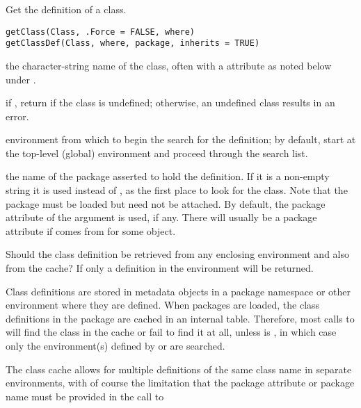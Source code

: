 %
\begin{Description}\relax
Get the definition of a class.
\end{Description}
%
\begin{Usage}
\begin{verbatim}
getClass(Class, .Force = FALSE, where)
getClassDef(Class, where, package, inherits = TRUE)
\end{verbatim}
\end{Usage}
%
\begin{Arguments}
\begin{ldescription}
\item[\code{Class}]  the character-string name of the class, often with a
 attribute as noted below under .
\item[\code{.Force}]  if , return  if the class is
undefined; otherwise, an undefined class results in an error.
\item[\code{where}]  environment from which to begin the search for the definition; by default,
start at the top-level (global) environment and proceed through
the search list.
\item[\code{package}]  the name of the package asserted to hold the
definition.  If it is a non-empty string it is used instead of
, as the first place to look for the class.
Note that the package must be loaded but need not be attached.  By
default, the package attribute of the  argument is
used, if any.  There will usually be a package attribute if
 comes from  for some object.

\item[\code{inherits}]  Should the class definition be retrieved from any
enclosing environment and also from the cache?  If 
only a definition in the environment  will be returned.

\end{ldescription}
\end{Arguments}
%
\begin{Details}\relax
Class definitions are stored in metadata objects in a package
namespace or other environment where they are defined.  When
packages are loaded, the class definitions in the package are cached in an internal
table.  Therefore, most calls to  will find the
class in the cache or fail to find it at all, unless 
is , in which case only the environment(s) defined by
 or  are searched.

The class cache allows for multiple definitions of the
same class name in separate environments, with of course the
limitation that the package attribute or package name must be
provided in the call to 

\end{Details}
